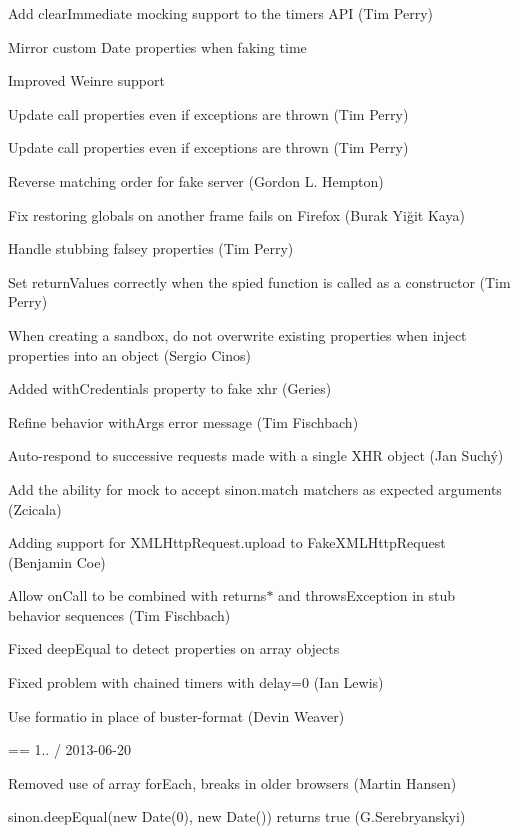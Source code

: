 \begin{DoxyItemize}
\item Add clear\+Immediate mocking support to the timers A\+PI (Tim Perry)
\item Mirror custom Date properties when faking time
\item Improved Weinre support
\item Update call properties even if exceptions are thrown (Tim Perry)
\item Update call properties even if exceptions are thrown (Tim Perry)
\item Reverse matching order for fake server (Gordon L. Hempton)
\item Fix restoring globals on another frame fails on Firefox (Burak Yiğit Kaya)
\item Handle stubbing falsey properties (Tim Perry)
\item Set return\+Values correctly when the spied function is called as a constructor (Tim Perry)
\item When creating a sandbox, do not overwrite existing properties when inject properties into an object (Sergio Cinos)
\item Added with\+Credentials property to fake xhr (Geries)
\item Refine behavior with\+Args error message (Tim Fischbach)
\item Auto-\/respond to successive requests made with a single X\+HR object (Jan Suchý)
\item Add the ability for mock to accept sinon.\+match matchers as expected arguments (Zcicala)
\item Adding support for X\+M\+L\+Http\+Request.\+upload to Fake\+X\+M\+L\+Http\+Request (Benjamin Coe)
\item Allow on\+Call to be combined with returns$\ast$ and throws\+Exception in stub behavior sequences (Tim Fischbach)
\item Fixed deep\+Equal to detect properties on array objects
\item Fixed problem with chained timers with delay=0 (Ian Lewis)
\item Use formatio in place of buster-\/format (Devin Weaver)
\end{DoxyItemize}

== 1.. / 2013-\/06-\/20


\begin{DoxyItemize}
\item Removed use of array for\+Each, breaks in older browsers (Martin Hansen)
\item sinon.\+deep\+Equal(new Date(0), new Date()) returns true (G.\+Serebryanskyi)
\end{DoxyItemize}

